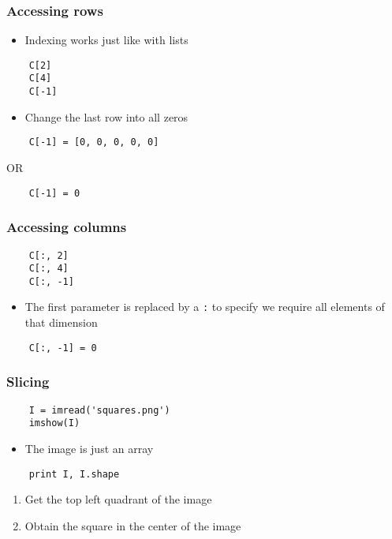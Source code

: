 \begin{frame}[fragile]
  \frametitle{Accessing rows}
  \begin{itemize}
  \item Indexing works just like with lists
  \end{itemize}
  \begin{lstlisting}
    C[2]
    C[4]
    C[-1]
  \end{lstlisting}
  \begin{itemize}
  \item Change the last row into all zeros
  \end{itemize}
  \begin{lstlisting}
    C[-1] = [0, 0, 0, 0, 0]
  \end{lstlisting}
  OR
  \begin{lstlisting}
    C[-1] = 0
  \end{lstlisting}
\end{frame}

\begin{frame}[fragile]
  \frametitle{Accessing columns}
  \begin{lstlisting}
    C[:, 2]
    C[:, 4]
    C[:, -1]
  \end{lstlisting}
  \begin{itemize}
  \item The first parameter is replaced by a \texttt{:} to specify we
    require all elements of that dimension
  \end{itemize}
  \begin{lstlisting}
    C[:, -1] = 0
  \end{lstlisting}
\end{frame}

\begin{frame}[fragile]
  \frametitle{Slicing}
  \begin{lstlisting}
    I = imread('squares.png')
    imshow(I)
  \end{lstlisting}
  \begin{itemize}
  \item The image is just an array
  \end{itemize}
  \begin{lstlisting}
    print I, I.shape
  \end{lstlisting}
  \begin{enumerate}
  \item Get the top left quadrant of the image
  \item Obtain the square in the center of the image
  \end{enumerate}
\end{frame}

